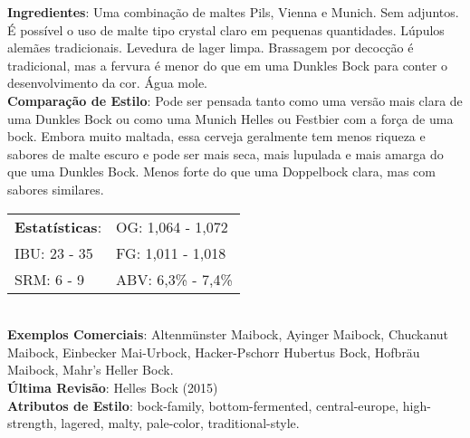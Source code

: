 \textbf{Ingredientes}: Uma combinação de maltes Pils, Vienna e Munich. Sem adjuntos. É possível o uso de malte tipo crystal claro em pequenas quantidades. Lúpulos alemães tradicionais. Levedura de lager limpa. Brassagem por decocção é tradicional, mas a fervura é menor do que em uma Dunkles Bock para conter o desenvolvimento da cor. Água mole. \\
\textbf{Comparação de Estilo}: Pode ser pensada tanto como uma versão mais clara de uma Dunkles Bock ou como uma Munich Helles ou Festbier com a força de uma bock. Embora muito maltada, essa cerveja geralmente tem menos riqueza e sabores de malte escuro e pode ser mais seca, mais lupulada e mais amarga do que uma Dunkles Bock. Menos forte do que uma Doppelbock clara, mas com sabores similares. \\
\begin{tabular}{@{}p{35mm}p{35mm}@{}}
  \textbf{Estatísticas}: & OG: 1,064 - 1,072 \\
  IBU: 23 - 35  & FG: 1,011 - 1,018  \\
  SRM: 6 - 9  & ABV: 6,3\% - 7,4\%
\end{tabular}\\
\textbf{Exemplos Comerciais}: Altenmünster Maibock, Ayinger Maibock, Chuckanut Maibock, Einbecker Mai-Urbock, Hacker-Pschorr Hubertus Bock, Hofbräu Maibock, Mahr’s Heller Bock. \\
\textbf{Última Revisão}: Helles Bock (2015) \\
\textbf{Atributos de Estilo}: bock-family, bottom-fermented, central-europe, high-strength, lagered, malty, pale-color, traditional-style.

